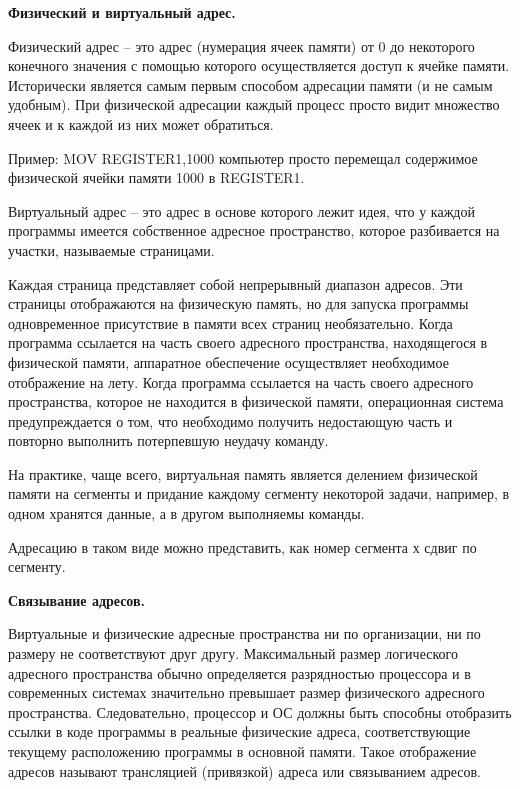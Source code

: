 \begin{center}{\bfseries Физический и виртуальный адрес.}
\end{center}

\begin{opr}
  Физический адрес – это адрес (нумерация ячеек памяти) от 0 до некоторого конечного значения с помощью которого осуществляется доступ к ячейке памяти. Исторически является самым первым способом адресации памяти (и не самым удобным). При физической адресации каждый процесс просто видит множество ячеек и к каждой из них может обратиться.
\end{opr}

\begin{example}
  Пример: MOV REGISTER1,1000
компьютер просто перемещал содержимое физической ячейки памяти 1000 в REGISTER1.
\end{example}

\begin{opr}
  Виртуальный адрес – это адрес в основе которого лежит идея, что у каждой программы имеется собственное адресное пространство, которое разбивается на участки, называемые страницами.
\end{opr}

Каждая страница представляет собой непрерывный диапазон адресов. Эти страницы отображаются на физическую память, но для запуска программы одновременное присутствие в памяти всех страниц необязательно. Когда программа ссылается на часть своего адресного пространства, находящегося в физической памяти, аппаратное обеспечение осуществляет необходимое отображение на лету. Когда программа ссылается на часть своего адресного пространства, которое не находится в физической памяти, операционная система предупреждается о том, что необходимо получить недостающую часть и повторно выполнить потерпевшую неудачу команду.

На практике, чаще всего, виртуальная память является делением физической памяти на сегменты и придание каждому сегменту некоторой задачи, например, в одном хранятся данные, а в другом выполняемы команды.

Адресацию в таком виде можно представить, как номер сегмента х сдвиг по сегменту.

\begin{center}{\bfseries Связывание адресов.}
\end{center}

Виртуальные и физические адресные пространства ни по организации, ни по размеру не соответствуют друг другу. Максимальный размер логического адресного пространства обычно определяется разрядностью процессора и в современных системах значительно превышает размер физического адресного пространства. Следовательно, процессор и ОС должны быть способны отобразить ссылки в коде программы в реальные физические адреса, соответствующие текущему расположению программы в основной памяти. Такое отображение адресов называют трансляцией (привязкой) адреса или связыванием адресов.

